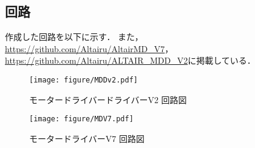 \newpage
\subsection{回路}
作成した回路を以下に示す．
また，\url{https://github.com/Altairu/AltairMD_V7}，
\url{https://github.com/Altairu/ALTAIR_MDD_V2}に掲載している．

\begin{figure}[h]
    \centering
    \texttt{[image: figure/MDDv2.pdf]}
    \caption{モータードライバードライバーV2 回路図}
\end{figure}

\begin{figure}[h]
    \centering
    \texttt{[image: figure/MDV7.pdf]}
    \caption{モータードライバーV7 回路図}
\end{figure}